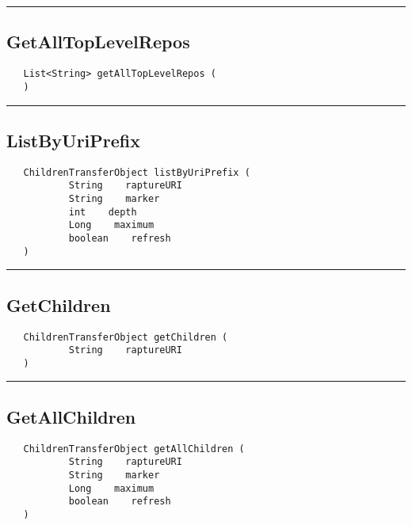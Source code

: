 \rule{15cm}{2pt}
\subsection{GetAllTopLevelRepos}
\label{Api:GetAllTopLevelRepos}
\begin{verbatim}
   List<String> getAllTopLevelRepos (
   )
\end{verbatim}



\rule{15cm}{2pt}
\subsection{ListByUriPrefix}
\label{Api:ListByUriPrefix}
\begin{verbatim}
   ChildrenTransferObject listByUriPrefix (
           String    raptureURI
           String    marker
           int    depth
           Long    maximum
           boolean    refresh
   )
\end{verbatim}



\rule{15cm}{2pt}
\subsection{GetChildren}
\label{Api:GetChildren}
\begin{verbatim}
   ChildrenTransferObject getChildren (
           String    raptureURI
   )
\end{verbatim}



\rule{15cm}{2pt}
\subsection{GetAllChildren}
\label{Api:GetAllChildren}
\begin{verbatim}
   ChildrenTransferObject getAllChildren (
           String    raptureURI
           String    marker
           Long    maximum
           boolean    refresh
   )
\end{verbatim}



